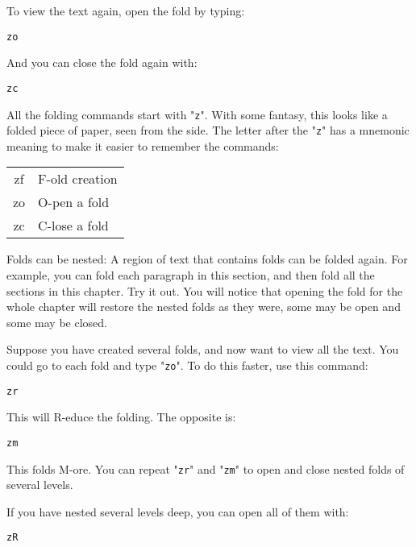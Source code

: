 To view the text again, open the fold by typing:

\begin{Verbatim}[samepage=true]
 zo
\end{Verbatim}

And you can close the fold again with:

\begin{Verbatim}[samepage=true]
 zc
\end{Verbatim}

All the folding commands start with "\texttt{z}".
With some fantasy, this looks like a folded piece of paper, seen from the side.
The letter after the "\texttt{z}" has a mnemonic meaning to make it easier to remember the commands:
\begin{center} \begin{tabular}{c l}
				zf & F-old creation \\
				zo & O-pen a fold \\
				zc & C-lose a fold \\
\end{tabular} \end{center}

Folds can be nested: A region of text that contains folds can be folded again.
For example, you can fold each paragraph in this section, and then fold all the sections in this chapter.
Try it out.
You will notice that opening the fold for the whole chapter will restore the nested folds as they were, some may be open and some may be closed.

Suppose you have created several folds, and now want to view all the text.
You could go to each fold and type "\texttt{zo}".
To do this faster, use this command:

\begin{Verbatim}[samepage=true]
 zr
\end{Verbatim}

This will R-educe the folding.
The opposite is:

\begin{Verbatim}[samepage=true]
 zm
\end{Verbatim}

This folds M-ore.
You can repeat "\texttt{zr}" and "\texttt{zm}" to open and close nested folds of several levels.

If you have nested several levels deep, you can open all of them with:

\begin{Verbatim}[samepage=true]
 zR
\end{Verbatim}

